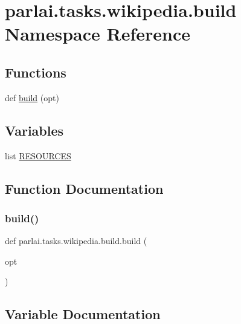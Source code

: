 \hypertarget{namespaceparlai_1_1tasks_1_1wikipedia_1_1build}{}\section{parlai.\+tasks.\+wikipedia.\+build Namespace Reference}
\label{namespaceparlai_1_1tasks_1_1wikipedia_1_1build}
\subsection*{Functions}
\begin{DoxyCompactItemize}
\item 
def \hyperlink{namespaceparlai_1_1tasks_1_1wikipedia_1_1build_acde71d9e655ae07210227d5bf00e77a0}{build} (opt)
\end{DoxyCompactItemize}
\subsection*{Variables}
\begin{DoxyCompactItemize}
\item 
list \hyperlink{namespaceparlai_1_1tasks_1_1wikipedia_1_1build_a11b3de332c21c9dfc761bba44ee2c923}{R\+E\+S\+O\+U\+R\+C\+ES}
\end{DoxyCompactItemize}


\subsection{Function Documentation}
\mbox{\label{namespaceparlai_1_1tasks_1_1wikipedia_1_1build_acde71d9e655ae07210227d5bf00e77a0}} 
\subsubsection{\texorpdfstring{build()}{build()}}
{\footnotesize\ttfamily def parlai.\+tasks.\+wikipedia.\+build.\+build (\begin{DoxyParamCaption}\item[{}]{opt }\end{DoxyParamCaption})}



\subsection{Variable Documentation}
\mbox{\label{namespaceparlai_1_1tasks_1_1wikipedia_1_1build_a11b3de332c21c9dfc761bba44ee2c923}} 
